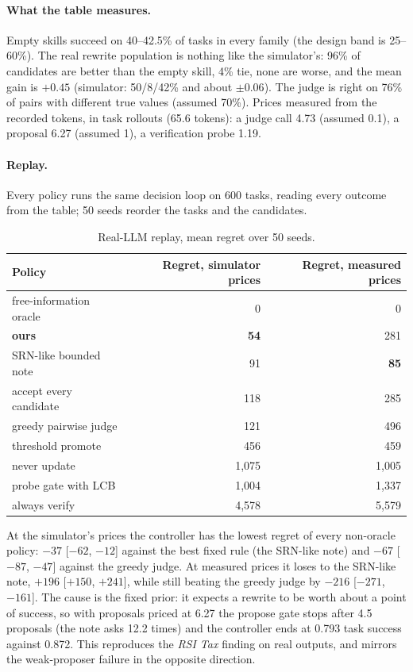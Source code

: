 \documentclass[11pt]{article}
\begin{document}
\paragraph{What the table measures.}  Empty skills succeed on 40--42.5\% of tasks in every
family (the design band is 25--60\%).  The real rewrite population is nothing like the
simulator's: 96\% of candidates are better than the empty skill, 4\% tie, none are worse,
and the mean gain is $+0.45$ (simulator: 50/8/42\% and about $\pm 0.06$).  The judge is right
on 76\% of pairs with different true values (assumed 70\%).  Prices measured from the recorded
tokens, in task rollouts (65.6 tokens): a judge call 4.73 (assumed 0.1), a proposal 6.27
(assumed 1), a verification probe 1.19.

\paragraph{Replay.}  Every policy runs the same decision loop on 600 tasks, reading every
outcome from the table; 50 seeds reorder the tasks and the candidates.

\begin{table}[!h]
\centering
\small
\begin{tabular}{lrr}
\toprule
Policy & Regret, simulator prices & Regret, measured prices \\
\midrule
free-information oracle & 0 & 0 \\
\textbf{ours} & \textbf{54} & 281 \\
SRN-like bounded note & 91 & \textbf{85} \\
accept every candidate & 118 & 285 \\
greedy pairwise judge & 121 & 496 \\
threshold promote & 456 & 459 \\
never update & 1,075 & 1,005 \\
probe gate with LCB & 1,004 & 1,337 \\
always verify & 4,578 & 5,579 \\
\bottomrule
\end{tabular}
\caption{Real-LLM replay, mean regret over 50 seeds.}
\label{tab:replay}
\end{table}

At the simulator's prices the controller has the lowest regret of every non-oracle policy:
$-37$ [$-62$, $-12$] against the best fixed rule (the SRN-like note) and $-67$ [$-87$, $-47$]
against the greedy judge.  At measured prices it loses to the SRN-like note, $+196$ [$+150$,
$+241$], while still beating the greedy judge by $-216$ [$-271$, $-161$].  The cause is the
fixed prior: it expects a rewrite to be worth about a point of success, so with proposals
priced at 6.27 the propose gate stops after 4.5 proposals (the note asks 12.2 times) and the
controller ends at 0.793 task success against 0.872.  This reproduces the \emph{RSI Tax}
finding on real outputs, and mirrors the weak-proposer failure in the opposite direction.
\end{document}

